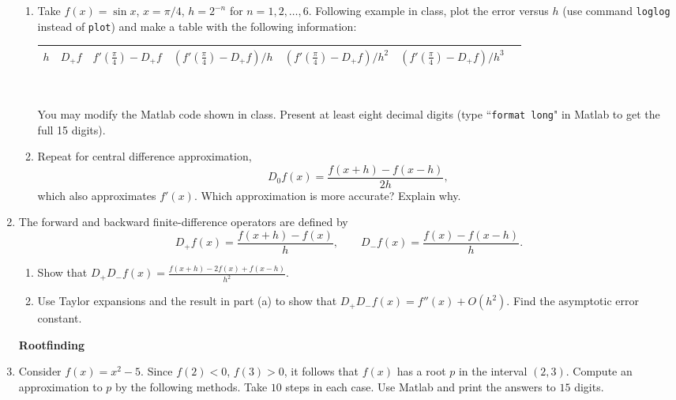 \documentclass [12pt]{article}
\begin{document}
\begin{enumerate}
{\bf }

\begin{enumerate}

\item Take $f(x)=\sin x$, $x=\pi/4$, $h=2^{-n}$ for $n=1,2,\ldots,6$. Following example in class, plot the error versus $h$ (use command {\tt loglog} instead of {\tt plot}) and make a table with the following information: 

\medskip


{\small
\hspace*{-20pt}
\begin{tabular}{|c|c|c|c|c|c|c|}
\hline
$h$  & $D_+f$ & $f'(\frac\pi 4)-D_+f$ & $(f'(\frac\pi 4)-D_+f)/h$ & $(f'(\frac\pi 4)-D_+f)/h^2$ & $(f'(\frac\pi 4)-D_+f)/h^3$\\
 \hline
\end{tabular}
}\

You may modify the Matlab code shown in class. Present at least eight decimal digits (type ``{\tt format long}" in Matlab to get the full 15 digits). 

\item Repeat for central difference approximation,
%
\[
D_0f(x)=\frac{f(x+h)-f(x-h)}{2h},
\]
%
which also approximates $f'(x)$. Which approximation is more accurate? Explain why.
\end{enumerate}

\item The forward and backward finite-difference operators are defined by
%
\[
D_+f(x)=\frac{f(x+h)-f(x)}{h}, \qquad D_-f(x)=\frac{f(x)-f(x-h)}{h}.
\]
%

\begin{enumerate}

\item Show that $\displaystyle D_+D_-f(x)=\frac{f(x+h)-2f(x)+f(x-h)}{h^2}$.

\item Use Taylor expansions and the result in part (a) to show that $D_+D_-f(x)=f''(x)+O(h^2)$. Find the asymptotic error constant.

\end{enumerate}

\hspace*{-15pt}
{\bf Rootfinding}

\item Consider $f(x) = x^2 - 5$. Since $f(2) < 0$, $f(3) > 0$, it follows that $f(x)$ has a root $p$ in the
interval $(2, 3)$. Compute an approximation to $p$ by the following methods. Take $10$ steps in
each case. Use Matlab and print the answers to $15$ digits.


\end{enumerate}
\end{document}
